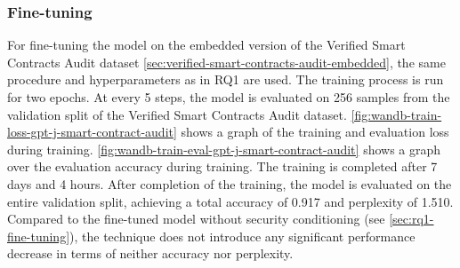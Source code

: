 \subsubsection{Fine-tuning}
For fine-tuning the model on the embedded version of the Verified Smart Contracts Audit dataset \cref{sec:verified-smart-contracts-audit-embedded}, the same procedure and hyperparameters as in RQ1 \label{sec:rq1-fine-tuning} are used. The training process is run for two epochs. At every 5 steps, the model is evaluated on 256 samples from the validation split of the Verified Smart Contracts Audit dataset. \cref{fig:wandb-train-loss-gpt-j-smart-contract-audit} shows a graph of the training and evaluation loss during training. \cref{fig:wandb-train-eval-gpt-j-smart-contract-audit} shows a graph over the evaluation accuracy during training. The training is completed after 7 days and 4 hours. After completion of the training, the model is evaluated on the entire validation split, achieving a total accuracy of 0.917 and perplexity of 1.510. Compared to the fine-tuned model without security conditioning (see \cref{sec:rq1-fine-tuning}), the technique does not introduce any significant performance decrease in terms of neither accuracy nor perplexity.

